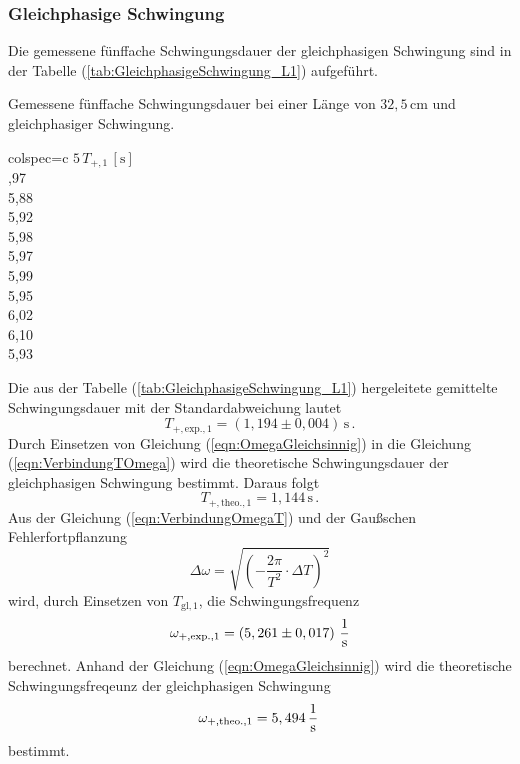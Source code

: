 \subsubsection{Gleichphasige Schwingung}
\label{sec:GleichphasigeSchwingung_KuresPendel}
Die gemessene fünffache Schwingungsdauer der gleichphasigen Schwingung sind in der Tabelle (\ref{tab:GleichphasigeSchwingung_L1}) aufgeführt.
\begin{table}[H]
  \centering
  \caption{Gemessene fünffache Schwingungsdauer bei einer Länge von $32,5\, \unit{\centi\meter}$ und gleichphasiger Schwingung.}
  \label{tab:GleichphasigeSchwingung_L1}
  \begin{tblr}{colspec={c}}
      \toprule
      $5\, T_{+, 1}\,\left[\unit{\second}\right]$\\
      ,97 \\
      5,88 \\
      5,92 \\
      5,98 \\
      5,97 \\
      5,99 \\
      5,95 \\
      6,02 \\
      6,10 \\
      5,93 \\
      \bottomrule
  \end{tblr}
\end{table}
Die aus der Tabelle (\ref{tab:GleichphasigeSchwingung_L1}) hergeleitete gemittelte Schwingungsdauer mit der Standardabweichung lautet
$$T_{+,\text{exp.}, 1} = \left( 1,194 \pm 0,004 \right)\,\unit{\second}\,.$$
Durch Einsetzen von Gleichung (\ref{eqn:OmegaGleichsinnig}) in die Gleichung (\ref{eqn:VerbindungTOmega}) wird die theoretische Schwingungsdauer der gleichphasigen Schwingung bestimmt. Daraus folgt
$$T_{+, \text{theo.}, 1} = 1,144\,\unit{\second}\,.$$
Aus der Gleichung (\ref{eqn:VerbindungOmegaT}) und der Gaußschen Fehlerfortpflanzung 
$$\Delta \omega = \sqrt{\left(-\frac{2 \pi}{T^{2}}\cdot \Delta T \right)^{2}}$$
wird, durch Einsetzen von $T_{\text{gl}, 1}$, die Schwingungsfrequenz
$$\omega_{+,\text{exp.}, 1} =  \left( 5,261 \pm 0,017 \right)\,\unit[per-mode=fraction]{\per \second}$$ berechnet. 
Anhand der Gleichung (\ref{eqn:OmegaGleichsinnig}) wird die theoretische Schwingungsfreqeunz der gleichphasigen Schwingung 
$$\omega_{+, \text{theo.}, 1} = 5,494\,\unit[per-mode=fraction]{\per \second}\,$$ bestimmt.
%
%
